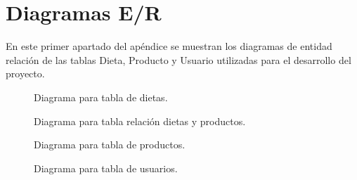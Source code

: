 \chapter{Diagramas E/R}

En este primer apartado del apéndice se muestran los diagramas de entidad relación de las tablas Dieta, Producto y Usuario utilizadas 
para el desarrollo del proyecto.

\begin{figure}[H]
	\centering
	\noindent{}
	\caption{Diagrama para tabla de dietas.}
\end{figure}

\begin{figure}[H]
	\centering
	\noindent{}
	\caption{Diagrama para tabla relación dietas y productos.}
\end{figure}

\begin{figure}[H]
	\centering
	\noindent{}
	\caption{Diagrama para tabla de productos.}
\end{figure}

\begin{figure}[H]
	\centering
	\noindent{}
	\caption{Diagrama para tabla de usuarios.}
\end{figure}
